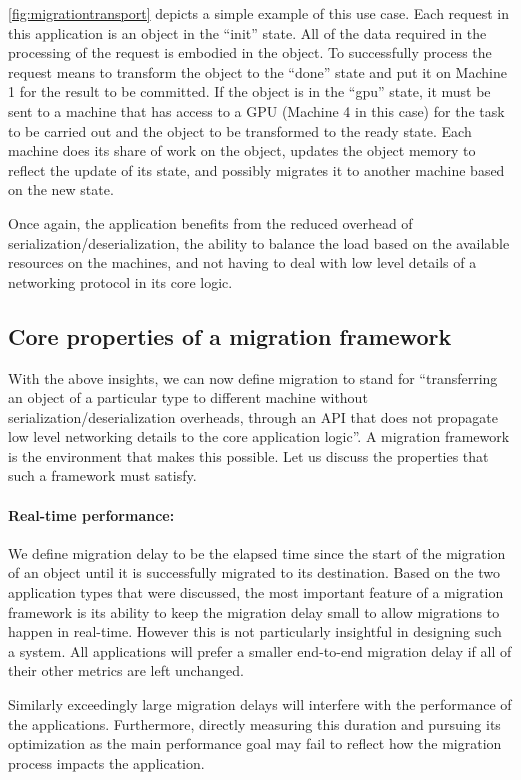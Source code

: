 \autoref{fig:migrationtransport} depicts a simple example of this use case.
Each request in this application is an object in the ``init'' state. All of the
data required in the processing of the request is embodied in the object.
To successfully process the request means to transform the object to the
``done'' state and put it on Machine 1 for the result to be committed.
If the object is in the ``gpu'' state, it must be sent to a machine that has access to a
GPU (Machine 4 in this case) for the task to be carried out and the object to be
transformed to the ready state. Each machine does its share of work on the
object, updates the object memory to reflect the update of its state, and
possibly migrates it to another machine based on the new state.

Once again, the application benefits from the reduced overhead of
serialization/deserialization, the ability to balance the load based on the
available resources on the machines, and not having to deal with low level
details of a networking protocol in its core logic.

\subsection{Core properties of a migration framework}
\label{subsec:coreprops}
With the above insights, we can now define migration to stand for
``transferring an object of a particular type to different machine without
serialization/deserialization overheads, through an API that does not
propagate low level networking details to the core application logic''. A
migration framework is the environment that makes this possible. Let us
discuss the properties that such a framework must satisfy.

\paragraph{Real-time performance:}
We define migration delay to be the elapsed time since the start of the
migration of an object until it is successfully migrated to its
destination. Based on the two application types that were discussed,
the most
important feature of a migration framework is its ability to keep the
migration delay small to allow migrations to happen in real-time.
However this is not particularly insightful in designing such a system.
All applications will prefer a smaller end-to-end migration delay
if all of their other metrics are left unchanged.

Similarly exceedingly
    large migration delays will interfere with the performance of
    the applications. Furthermore, directly measuring this
    duration and pursuing its optimization as the main performance goal
    may fail to reflect how the migration process impacts the application.


